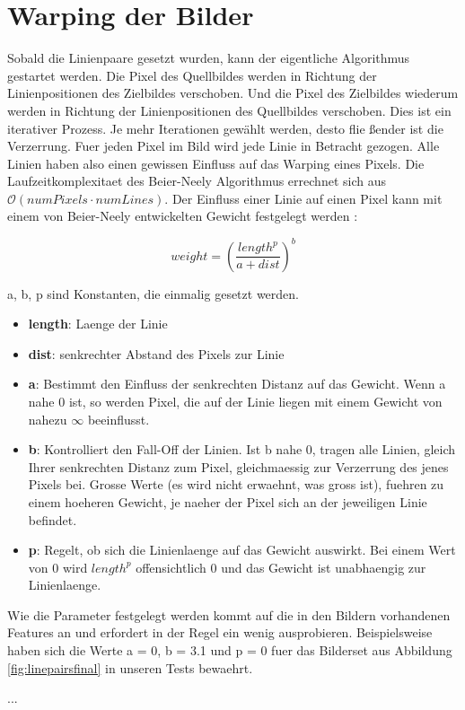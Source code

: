 \chapter{Warping der Bilder}

Sobald die Linienpaare gesetzt wurden, kann der eigentliche Algorithmus gestartet werden. Die Pixel
des Quellbildes werden in Richtung der Linienpositionen des Zielbildes verschoben. Und die Pixel
des Zielbildes wiederum werden in Richtung der Linienpositionen des Quellbildes verschoben.
Dies ist ein iterativer Prozess. Je mehr Iterationen gewählt werden, desto flie \ss ender ist
die Verzerrung.
Fuer jeden Pixel im Bild wird jede Linie in Betracht gezogen. Alle Linien haben also einen gewissen Einfluss auf
das Warping eines Pixels. Die Laufzeitkomplexitaet
des Beier-Neely Algorithmus errechnet sich aus
$\mathcal{O}(numPixels \cdot numLines)$.
Der Einfluss einer Linie auf einen Pixel kann mit einem
von Beier-Neely entwickelten Gewicht festgelegt werden
\cite{beierneely}:

\begin{equation}
	weight = \left(\frac{length^{p}}{a+dist}\right)^{b}
\end{equation}

a, b, p sind Konstanten, die einmalig gesetzt werden.

\begin{itemize}
	\item \textbf{length}: Laenge der Linie
	\item \textbf{dist}: senkrechter Abstand des Pixels zur Linie
	\item \textbf{a}: Bestimmt den Einfluss der senkrechten Distanz
	auf das Gewicht. Wenn a nahe 0 ist, so werden Pixel, die auf der
	Linie liegen mit einem Gewicht von nahezu $\infty$ beeinflusst.
	\item \textbf{b}: Kontrolliert den Fall-Off der Linien. Ist b
	nahe 0, tragen alle Linien, gleich Ihrer senkrechten Distanz zum
	Pixel, gleichmaessig zur Verzerrung des jenes Pixels bei.
	Grosse Werte (es wird nicht erwaehnt, was gross ist), fuehren
	zu einem hoeheren Gewicht, je naeher der Pixel sich an
	der jeweiligen Linie befindet.
	\item \textbf{p}: Regelt, ob sich die Linienlaenge auf das Gewicht
	auswirkt. Bei einem Wert von 0 wird $length^{p}$ offensichtlich 0
	und das Gewicht ist unabhaengig zur Linienlaenge.
\end{itemize}

Wie die Parameter festgelegt werden kommt auf die in den Bildern
vorhandenen Features an und erfordert in der Regel ein wenig
ausprobieren. Beispielsweise haben sich die Werte 
a = 0, b = 3.1 und p = 0 fuer das Bilderset aus Abbildung
\ref{fig:linepairsfinal} in unseren Tests bewaehrt.







...
